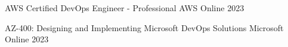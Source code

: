 
\begin{cvhonors}

  \cvhonor
    {AWS Certified DevOps Engineer - Professional} %
    {AWS} %
    {Online} %
    {2023} %

  \cvhonor
    {AZ-400: Designing and Implementing Microsoft DevOps Solutions} %
    {Microsoft} %
    {Online} %
    {2023} %


\end{cvhonors}







